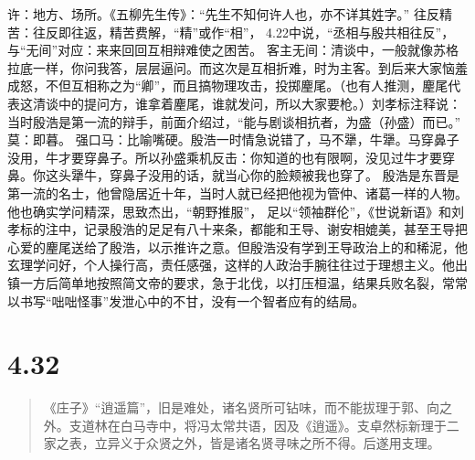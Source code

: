 \documentclass[]{book}
\begin{document}
许：地方、场所。《五柳先生传》：``先生不知何许人也，亦不详其姓字。''
往反精苦：往反即往返，精苦费解，``精''或作``相''，
4.22中说，``丞相与殷共相往反''，与``无间''对应：来来回回互相辩难使之困苦。
客主无间：清谈中，一般就像苏格拉底一样，你问我答，层层逼问。而这次是互相折难，时为主客。到后来大家恼羞成怒，不但互相称之为``卿''，而且搞物理攻击，投掷麈尾。（也有人推测，麈尾代表这清谈中的提问方，谁拿着麈尾，谁就发问，所以大家要枪。）刘孝标注释说：当时殷浩是第一流的辩手，前面介绍过，``能与剧谈相抗者，为盛（孙盛）而已。''
莫：即暮。
强口马：比喻嘴硬。殷浩一时情急说错了，马不犟，牛犟。马穿鼻子没用，牛才要穿鼻子。所以孙盛乘机反击：你知道的也有限啊，没见过牛才要穿鼻。你这头犟牛，穿鼻子没用的话，就当心你的脸颊被我也穿了。
殷浩是东晋是第一流的名士，他曾隐居近十年，当时人就已经把他视为管仲、诸葛一样的人物。他也确实学问精深，思致杰出，``朝野推服''，
足以``领袖群伦''，《世说新语》和刘孝标的注中，记录殷浩的足足有八十来条，都能和王导、谢安相媲美，甚至王导把心爱的麈尾送给了殷浩，以示推许之意。但殷浩没有学到王导政治上的和稀泥，他玄理学问好，个人操行高，责任感强，这样的人政治手腕往往过于理想主义。他出镇一方后简单地按照简文帝的要求，急于北伐，以打压桓温，结果兵败名裂，常常以书写``咄咄怪事''发泄心中的不甘，没有一个智者应有的结局。

\section{4.32}\label{section-210}

\begin{quote}
《庄子》``逍遥篇''，旧是难处，诸名贤所可钻味，而不能拔理于郭、向之外。支道林在白马寺中，将冯太常共语，因及《逍遥》。支卓然标新理于二家之表，立异义于众贤之外，皆是诸名贤寻味之所不得。后遂用支理。
\end{quote}
\end{document}
